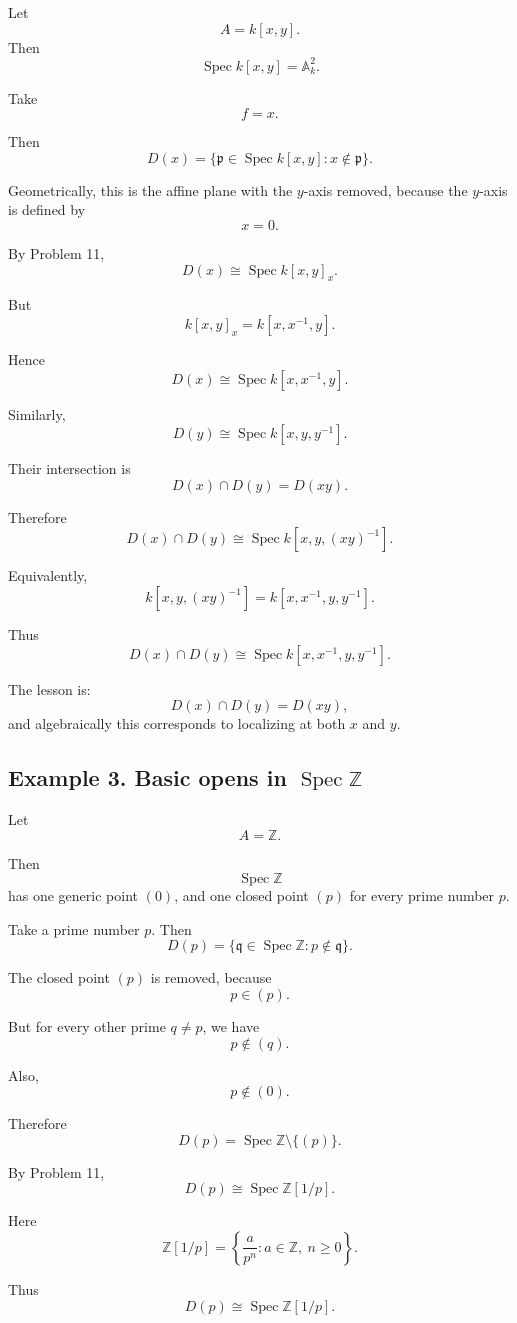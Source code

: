 \documentclass[12pt,a4paper]{article}
\newcommand{\Spec}{\operatorname{Spec}}
\theoremstyle{notespace}
\begin{document}
Let
\[
A=k[x,y].
\]
Then
\[
\Spec k[x,y]=\mathbb A^2_k.
\]

Take
\[
f=x.
\]

Then
\[
D(x)=\{\mathfrak p\in \Spec k[x,y]:x\notin\mathfrak p\}.
\]

Geometrically, this is the affine plane with the \(y\)-axis removed, because the \(y\)-axis is defined by
\[
x=0.
\]

By Problem 11,
\[
D(x)\cong \Spec k[x,y]_x.
\]

But
\[
k[x,y]_x=k[x,x^{-1},y].
\]

Hence
\[
\boxed{
	D(x)\cong \Spec k[x,x^{-1},y].
}
\]

Similarly,
\[
D(y)\cong \Spec k[x,y,y^{-1}].
\]

Their intersection is
\[
D(x)\cap D(y)=D(xy).
\]

Therefore
\[
D(x)\cap D(y)
\cong
\Spec k[x,y,(xy)^{-1}].
\]

Equivalently,
\[
k[x,y,(xy)^{-1}]
=
k[x,x^{-1},y,y^{-1}].
\]

Thus
\[
\boxed{
	D(x)\cap D(y)
	\cong
	\Spec k[x,x^{-1},y,y^{-1}].
}
\]

The lesson is:
\[
\boxed{
	D(x)\cap D(y)=D(xy),
}
\]
and algebraically this corresponds to localizing at both \(x\) and \(y\).

\subsection{Example 3. Basic opens in \(\Spec\mathbb Z\)}

Let
\[
A=\mathbb Z.
\]

Then
\[
\Spec\mathbb Z
\]
has one generic point \((0)\), and one closed point \((p)\) for every prime number \(p\).

Take a prime number \(p\). Then
\[
D(p)=\{\mathfrak q\in\Spec\mathbb Z:p\notin\mathfrak q\}.
\]

The closed point \((p)\) is removed, because
\[
p\in(p).
\]

But for every other prime \(q\neq p\), we have
\[
p\notin(q).
\]

Also,
\[
p\notin(0).
\]

Therefore
\[
D(p)=\Spec\mathbb Z\setminus\{(p)\}.
\]

By Problem 11,
\[
D(p)\cong \Spec \mathbb Z[1/p].
\]

Here
\[
\mathbb Z[1/p]
=
\left\{
\frac{a}{p^n}:a\in\mathbb Z,\ n\geq 0
\right\}.
\]

Thus
\[
\boxed{
	D(p)\cong \Spec \mathbb Z[1/p].
}
\]
\end{document}
